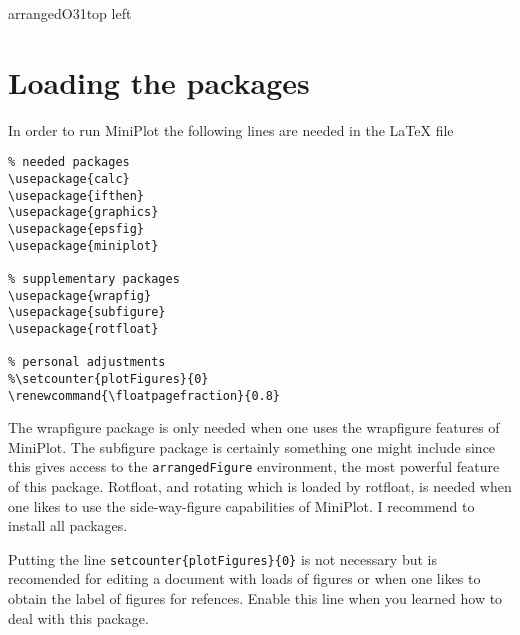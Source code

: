 \documentclass[12pt,a4paper]{article}
\newcommand{\comm}[1]{\texttt{#1}}
\renewcommand{\floatpagefraction}{0.8}    %
\begin{document}
\begin{arrangedFigure}{2}{3}{arrangedO31}{top left}
\end{arrangedFigure}



\clearpage




\section{Loading the packages}

In order to run MiniPlot the following lines are needed in the \LaTeX
file


\begin{verbatim}
% needed packages
\usepackage{calc}
\usepackage{ifthen}
\usepackage{graphics}
\usepackage{epsfig}
\usepackage{miniplot}

% supplementary packages
\usepackage{wrapfig}
\usepackage{subfigure}
\usepackage{rotfloat}

% personal adjustments
%\setcounter{plotFigures}{0}
\renewcommand{\floatpagefraction}{0.8}    
\end{verbatim}

The wrapfigure package is only needed when one uses the wrapfigure
features of MiniPlot. The subfigure package is certainly something
one might include since this gives access to the \comm{arrangedFigure}
environment, the most powerful feature of this package.
Rotfloat, and rotating which is loaded by rotfloat, is needed when one 
likes to use the side-way-figure capabilities of MiniPlot.
I recommend to install all packages.

Putting the line \comm{setcounter\{plotFigures\}\{0\}} is not necessary but is
recomended for editing a document with loads of figures or when one likes
to obtain the label of figures for refences. Enable this line when you learned 
how to deal with this package.
\end{document}
